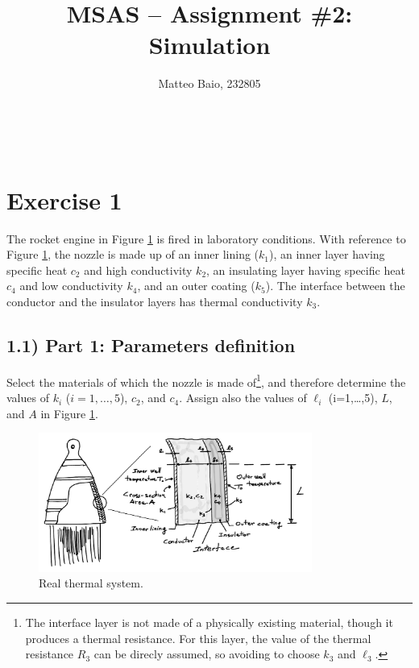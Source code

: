 \documentclass[11pt,a4paper,oneside]{article}
\title{MSAS -- Assignment \#2: Simulation}  %
\author{\large Matteo Baio, 232805}
\date{}
\makeatletter
\newcommand\headlinecolor{\normalcolor}
\renewcommand*\maketitle{
    \begingroup
    \centering
    \fontsize{14.4}{14.4}       %
    \selectfont
    \headlinecolor
    \@title\\
    \vspace{5mm}
    \@author
    \par
    \vskip1in
    \endgroup
    \vspace{-22mm}
}
\makeatother
\begin{document}
\maketitle
\thispagestyle{fancy}

\section*{Exercise 1}
The rocket engine in Figure \ref{fig:therm} is fired in laboratory conditions.
With reference to Figure \ref{fig:therm}, the nozzle is made up of an inner lining ($k_1$), an inner layer having specific heat $c_2$ and high conductivity $k_2$, an insulating layer having specific heat $c_4$ and low conductivity $k_4$, and an outer coating ($k_5$).
The interface between the conductor and the insulator layers has thermal conductivity $k_3$.

\subsection*{1.1) Part 1: Parameters definition}
Select the materials of which the nozzle is made of\footnote{The interface layer is not made of a physically existing material, though it produces a thermal resistance.
For this layer, the value of the thermal resistance $R_3$ can be direcly assumed, so avoiding to choose $k_3$ and $\ell_3$.}, and therefore determine the values of $k_i$ ($i=1,\dots,5$), $c_2$, and $c_4$.
Assign also the values of $\ell_i$ (i=1,\dots,5), $L$, and $A$ in Figure \ref{fig:therm}.
\begin{figure}[ht!]
    \centering
    \includegraphics[width=0.8\textwidth]{Figures/fig_therm.pdf}
    \caption{\label{fig:therm} Real thermal system.}
\end{figure}
\end{document}
